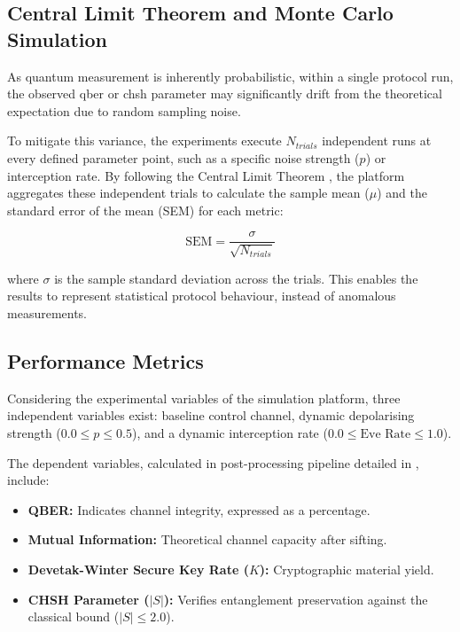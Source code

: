 \subsection{Central Limit Theorem and Monte Carlo Simulation}
\label{subsec:clt_monte_carlo}

As quantum measurement is inherently probabilistic, within a single protocol run, the observed \gls{qber} or \gls{chsh} parameter may significantly drift from the theoretical expectation due to random sampling noise. 

To mitigate this variance, the experiments execute $N_{trials}$ independent runs at every defined parameter point, such as a specific noise strength ($p$) or interception rate. By following the Central Limit Theorem \cite{montgomery2018}, the platform aggregates these independent trials to calculate the sample mean ($\mu$) and the standard error of the mean (SEM) for each metric:

\begin{equation}
\text{SEM} = \frac{\sigma}{\sqrt{N_{trials}}}
\label{eq:sem}
\end{equation}

where $\sigma$ is the sample standard deviation across the trials. This enables the results to represent statistical protocol behaviour, instead of anomalous measurements. 

\subsection{Performance Metrics}
\label{subsec:performance_metrics}

Considering the experimental variables of the simulation platform, three independent variables exist: baseline control channel, dynamic depolarising strength ($0.0 \leq p \leq 0.5$), and a dynamic interception rate ($0.0 \leq \text{Eve Rate} \leq 1.0$). 

The dependent variables, calculated in post-processing pipeline detailed in , include:

\begin{itemize}
    \item \textbf{QBER:} Indicates channel integrity, expressed as a percentage.
    \item \textbf{Mutual Information:} Theoretical channel capacity after sifting.
    \item \textbf{Devetak-Winter Secure Key Rate ($K$):} Cryptographic material yield.
    \item \textbf{CHSH Parameter ($|S|$):} Verifies entanglement preservation against the classical bound ($|S| \leq 2.0$).
\end{itemize}

